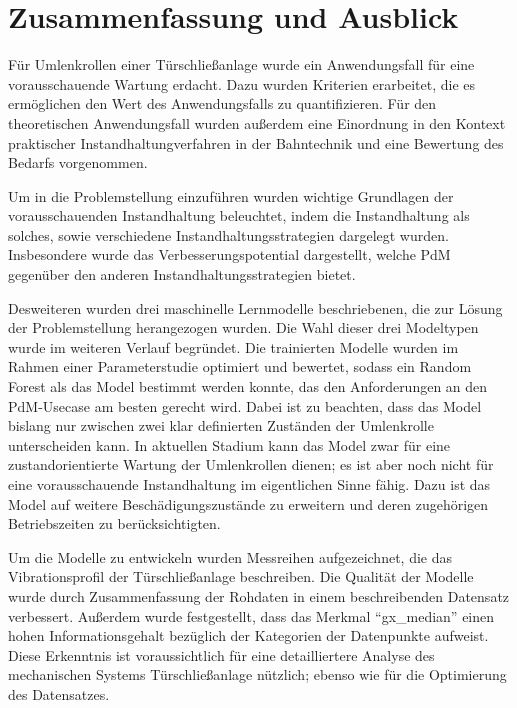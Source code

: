 \chapter{Zusammenfassung und Ausblick}
\label{ch:fazit}
Für Umlenkrollen einer Türschließanlage wurde ein Anwendungsfall für eine vorausschauende Wartung erdacht. Dazu wurden Kriterien erarbeitet, die es ermöglichen den Wert des Anwendungsfalls zu quantifizieren. Für den theoretischen Anwendungsfall wurden außerdem eine Einordnung in den Kontext praktischer Instandhaltungverfahren in der Bahntechnik und eine Bewertung des Bedarfs vorgenommen.

Um in die Problemstellung einzuführen wurden wichtige Grundlagen der vorausschauenden Instandhaltung beleuchtet, indem die Instandhaltung als solches, sowie verschiedene Instandhaltungsstrategien dargelegt wurden. Insbesondere wurde das Verbesserungspotential dargestellt, welche PdM gegenüber den anderen Instandhaltungsstrategien bietet.

Desweiteren wurden drei maschinelle Lernmodelle beschriebenen, die zur Lösung der Problemstellung herangezogen wurden. Die Wahl dieser drei Modeltypen wurde im weiteren Verlauf begründet. Die trainierten Modelle wurden im Rahmen einer Parameterstudie optimiert und bewertet, sodass ein Random Forest als das Model bestimmt werden konnte, das den Anforderungen an den PdM-Usecase am besten gerecht wird. Dabei ist zu beachten, dass das Model bislang nur zwischen zwei klar definierten Zuständen der Umlenkrolle unterscheiden kann. In aktuellen Stadium kann das Model zwar für eine zustandorientierte Wartung der Umlenkrollen dienen; es ist aber noch nicht für eine vorausschauende Instandhaltung im eigentlichen Sinne fähig. Dazu ist das Model auf weitere Beschädigungszustände zu erweitern und deren zugehörigen Betriebszeiten zu berücksichtigten.

Um die Modelle zu entwickeln wurden Messreihen aufgezeichnet, die das Vibrationsprofil der Türschließanlage beschreiben. Die Qualität der Modelle wurde durch Zusammenfassung der Rohdaten in einem beschreibenden Datensatz verbessert. Außerdem wurde festgestellt, dass das Merkmal \enquote{gx\_median} einen hohen Informationsgehalt bezüglich der Kategorien der Datenpunkte aufweist. Diese Erkenntnis ist voraussichtlich für eine detailliertere Analyse des mechanischen Systems Türschließanlage nützlich; ebenso wie für die Optimierung des Datensatzes.

